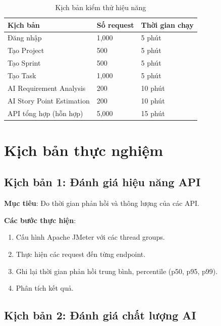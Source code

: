 \documentclass[12pt,a4paper]{report}
\begin{document}
\begin{table}[H]
\centering
\caption{Kịch bản kiểm thử hiệu năng}
\begin{tabular}{|p{4cm}|p{4.5cm}|p{5cm}|}
\hline
\textbf{Kịch bản} & \textbf{Số request} & \textbf{Thời gian chạy} \\
\hline
Đăng nhập & 1,000 & 5 phút \\
\hline
Tạo Project & 500 & 5 phút \\
\hline
Tạo Sprint & 500 & 5 phút \\
\hline
Tạo Task & 1,000 & 5 phút \\
\hline
AI Requirement Analysis & 200 & 10 phút \\
\hline
AI Story Point Estimation & 200 & 10 phút \\
\hline
API tổng hợp (hỗn hợp) & 5,000 & 15 phút \\
\hline
\end{tabular}
\label{tab:perf_scenarios}
\end{table}

\section{Kịch bản thực nghiệm}

\subsection{Kịch bản 1: Đánh giá hiệu năng API}

\textbf{Mục tiêu}: Đo thời gian phản hồi và thông lượng của các API.

\textbf{Các bước thực hiện}:

\begin{enumerate}
\item Cấu hình Apache JMeter với các thread groups.
\item Thực hiện các request đến từng endpoint.
\item Ghi lại thời gian phản hồi trung bình, percentile (p50, p95, p99).
\item Phân tích kết quả.
\end{enumerate}

\subsection{Kịch bản 2: Đánh giá chất lượng AI}
\end{document}
